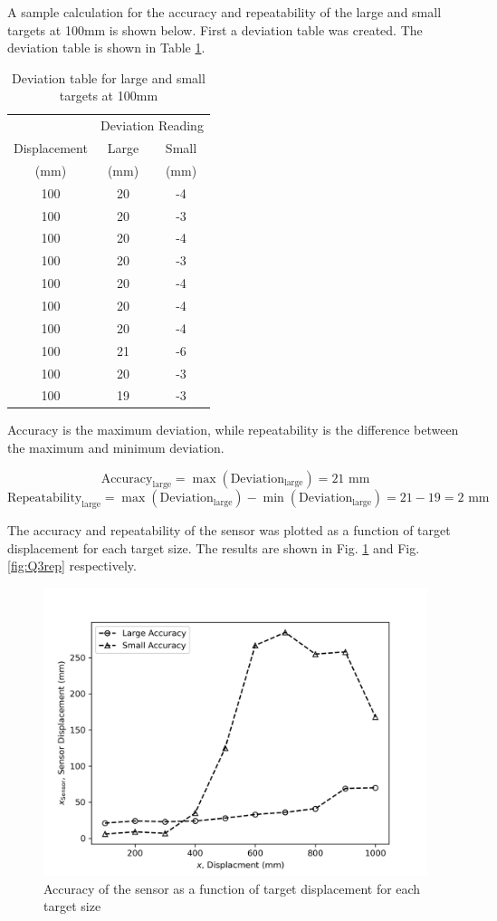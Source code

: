 A sample calculation for the accuracy and repeatability of the large and small targets at 100mm is shown below. First a deviation table was created. 
The deviation table is shown in Table \ref{tab:Q3a-deviation}.

\begin{table}[h]
    \centering
    \caption{Deviation table for large and small targets at 100mm}
    \label{tab:Q3a-deviation}
    \begin{tabular}{ccc}
        \hline
        & \multicolumn{2}{c}{Deviation Reading} \\
        \cline{2-3}
        Displacement & Large & Small \\
        (mm) & (mm) & (mm) \\
        \midrule
        100 & 20 & -4 \\
        100 & 20 & -3 \\
        100 & 20 & -4 \\
        100 & 20 & -3 \\
        100 & 20 & -4 \\
        100 & 20 & -4 \\
        100 & 20 & -4 \\
        100 & 21 & -6 \\
        100 & 20 & -3 \\
        100 & 19 & -3 \\
        \hline
    \end{tabular}
\end{table}

Accuracy is the maximum deviation, while repeatability is the difference between the maximum and minimum deviation.

\[
    \boxed{\text{Accuracy}_\text{large} = \max(\text{Deviation}_\text{large}) = 21 \text{ mm}}
\]
\[
    \boxed{\text{Repeatability}_\text{large} = \max(\text{Deviation}_\text{large}) - \min(\text{Deviation}_\text{large}) = 21 - 19 = 2 \text{ mm}}
\]

\FloatBarrier
The accuracy and repeatability of the sensor was plotted as a function of target displacement for each target size. The results are shown in Fig. \ref{fig:Q3acc} 
and Fig. \ref{fig:Q3rep} respectively.
\begin{figure}[h]
    \centering
    \includegraphics[width=0.6\linewidth]{matplotlib/Q3acc.png}
    \caption{Accuracy of the sensor as a function of target displacement for each target size}
    \label{fig:Q3acc}
\end{figure}

